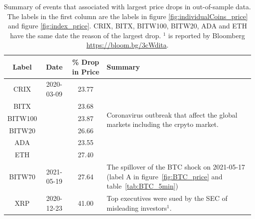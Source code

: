 \begin{table}[ht]
    \centering
      \begin{tabularx}{.8\textwidth}{cccX}
        \toprule
        Label &  Date & \% Drop in Price &  Summary\\
        \midrule
        CRIX    &2020-03-09 & 23.77 & \multirow[t]{6}{\hsize}{Coronavirus outbreak that affect the global markets including the crpyto market.}\\
        BITX    & & 23.68 &  \\
        BITW100 & & 23.87 &  \\
        BITW20  & & 26.66 &  \\
        ADA     & &23.55 &  \\
        ETH     & &27.40 &  \\

        BITW70  & 2021-05-19& 27.64 & The spillover of the BTC shock on 2021-05-17 (label A in figure~\ref{fig:BTC_price} and table~\ref{tab:BTC_5min})\\

        XRP     & 2020-12-23 & 41.00 & Top executives were sued by the SEC of misleading investors$^1$. \\
        \bottomrule
      \end{tabularx}
        \caption{Summary of events that associated with largest price drops in out-of-sample data.
        The labels in the first column are the labels in figure \ref{fig:individualCoins_price} and figure \ref{fig:index_price}.
        CRIX, BITX, BITW100, BITW20, ADA and ETH have the same date the reason of the largest drop. $^1$ is reported by Bloomberg \url{https://bloom.bg/3cWdita}.}
        \label{tab:All_min}
  \end{table}


